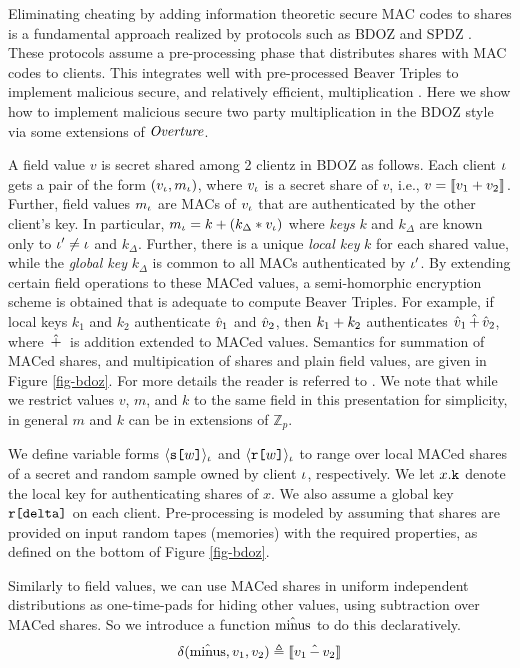 Eliminating cheating by adding information theoretic secure MAC codes
to shares is a fundamental approach realized by protocols such as BDOZ
\cite{XXX} and SPDZ \cite{XXX}.  These protocols assume a
pre-processing phase that distributes shares with MAC codes to
clients.  This integrates well with pre-processed Beaver Triples to
implement malicious secure, and relatively efficient, multiplication
\cite{XXX}.  Here we show how to implement malicious secure two party
multiplication in the BDOZ style via some extensions of $\mathit{Overture}$.

A field value $v$ is secret shared among 2 clientz in BDOZ as follows.
Each client $\iota$ gets a pair of the form $(v_\iota,m_\iota)$, where
$v_\iota$ is a secret share of $v$, i.e., $v = \llbracket v_1 + v_2 \rrbracket_{}$.
Further, field values $m_\iota$ are MACs of $v_\iota$ that are authenticated
by the other client's key. In particular, $m_\iota = k + (k_\Delta *
v_\iota)$ where \emph{keys} $k$ and $k_\Delta$ are known only to $\iota'
\ne \iota$ and $k_\Delta$. Further, there is a unique \emph{local key}
$k$ for each shared value, while the \emph{global key} $k_\Delta$ is
common to all MACs authenticated by $\iota'$. By extending certain
field operations to these MACed values, a semi-homorphic encryption
scheme is obtained that is adequate to compute Beaver Triples. For
example, if local keys $k_1$ and $k_2$ authenticate $\hat{v}_1$ and
$\hat{v}_2$, then $k_1 + k_2$ authenticates $\hat{v}_1 \,\hat{+}\,
\hat{v}_2$, where $\,\hat{+}\,$ is addition extended to MACed
values. Semantics for summation of MACed shares, and multipication of
shares and plain field values, are given in Figure \ref{fig-bdoz}.
For more details the reader is referred to \cite{XXX}. We note
that while we restrict values $v$, $m$, and $k$ to the same
field in this presentation for simplicity, in general $m$ and
$k$ can be in extensions of $\mathbb{Z}_p$. 

We define variable forms $\langle \texttt{s[}w\texttt{]} \rangle_{\iota}$ and
$\langle \texttt{r[}w\texttt{]} \rangle_{\iota}$ to range over local MACed shares of a secret
and random sample owned by client $\iota$, respectively. We let
$x.\texttt{k}_{}$ denote the local key for authenticating shares of $x$.
We also assume a global key $\texttt{r[}\texttt{delta}\texttt{]}$ on each client.
Pre-processing is modeled by assuming that shares are provided on
input random tapes (memories) with the required properties, as defined
on the bottom of Figure \ref{fig-bdoz}.

Similarly to field values, we can use MACed shares in
uniform independent distributions as one-time-pads for
hiding other values, using subtraction over MACed shares.
So we introduce a function $\hat{\mathrm{minus}}$ to do this
declaratively.
$$
\delta(\hat{\mathrm{minus}},v_1,v_2) \triangleq \llbracket v_1 \,\hat{-}\, v_2 \rrbracket_{}
$$

